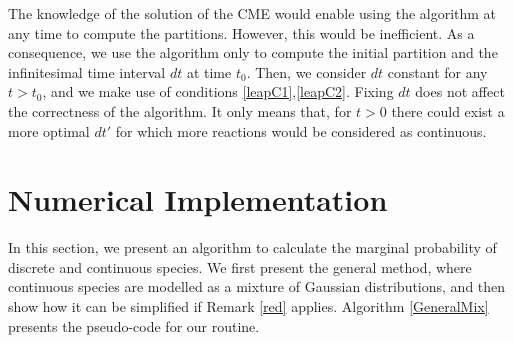 \documentclass{llncs}
\begin{document}
The knowledge of the solution of the CME would enable using the algorithm at any time to compute the partitions. However, this would be inefficient. As a consequence, we use the algorithm only to compute the initial partition and the infinitesimal time interval $dt$ at time $t_0$. Then, we consider $dt$ constant for any $t>t_0$, and we make use of conditions \eqref{leapC1},\eqref{leapC2}. Fixing $dt$ does not affect the correctness of the algorithm. It only means that, for $t>0$ there could exist a more optimal $dt'$ for which more reactions would be considered as continuous. 
\fi
\section{Numerical Implementation}\label{ImplementationImpr}

In this section, %
we present an algorithm to calculate the marginal probability of discrete and continuous species. 
We first present the general method, where continuous species are modelled as a mixture of Gaussian distributions, and then show how it can be simplified if Remark \ref{red} applies.
Algorithm \ref{GeneralMix} presents the pseudo-code for our routine.
\end{document}
